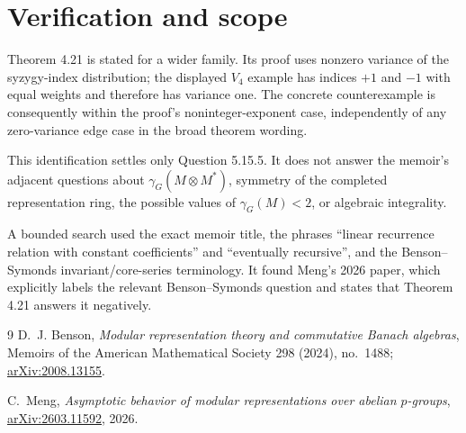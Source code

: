 \documentclass[11pt]{article}
\begin{document}
\section{Verification and scope}

Theorem 4.21 is stated for a wider family. Its proof uses nonzero variance of
the syzygy-index distribution; the displayed $V_4$ example has indices
$+1$ and $-1$ with equal weights and therefore has variance one. The concrete
counterexample is consequently within the proof's noninteger-exponent case,
independently of any zero-variance edge case in the broad theorem wording.

This identification settles only Question 5.15.5. It does not answer the
memoir's adjacent questions about
$\gamma_G(M\otimes M^*)$, symmetry of the completed representation ring,
the possible values of $\gamma_G(M)<2$, or algebraic integrality.

A bounded search used the exact memoir title, the phrases ``linear recurrence
relation with constant coefficients'' and ``eventually recursive'', and the
Benson--Symonds invariant/core-series terminology. It found Meng's 2026
paper, which explicitly labels the relevant Benson--Symonds question and
states that Theorem 4.21 answers it negatively.

\begin{thebibliography}{9}
D.~J. Benson,
\emph{Modular representation theory and commutative Banach algebras},
Memoirs of the American Mathematical Society 298 (2024), no.~1488;
\href{https://arxiv.org/abs/2008.13155}{arXiv:2008.13155}.

C.~Meng,
\emph{Asymptotic behavior of modular representations over abelian
$p$-groups},
\href{https://arxiv.org/abs/2603.11592}{arXiv:2603.11592}, 2026.
\end{thebibliography}
\end{document}
